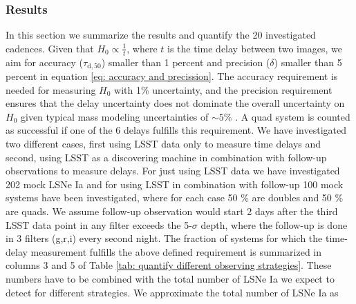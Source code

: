 \subsubsection{Results}
\label{sec:results}
In this section we summarize the results and quantify the 20
investigated cadences. Given that $H_0 \propto \frac{1}{t}$, where $t$
is the time delay between two images, we aim for accuracy
($\tau_\mathrm{d,50}$) smaller than 1 percent and precision ($\delta$)
smaller than 5 percent in equation \ref{eq: accuracy and precission}. The accuracy
requirement is needed for measuring $H_0$ with 1\% uncertainty, and
the precision requirement ensures that the delay uncertainty does not
dominate the overall uncertainty on $H_0$ given typical mass modeling
uncertainties of $\sim 5\%$ \citep[e.g.,][]{Suyu2018}.  A quad system is counted as successful if one of the 6 delays fulfills this requirement. 
We have investigated two different cases, first using LSST data only to measure time delays and second, using LSST as a discovering machine in combination with follow-up observations to measure delays. 
For just using LSST data we have investigated 202 mock LSNe Ia and for using LSST in combination with follow-up 100 mock systems have been investigated, where for each case 50 \% are doubles and 50 \% are quads. 
We assume follow-up observation would start 2 days 
after the third LSST data point in any filter exceeds the 5-$\sigma$ 
depth, where the follow-up is done in 3 filters (g,r,i) every second night.
The fraction of systems for which the time-delay measurement fulfills the above defined requirement is summarized in columns 3 and 5 of Table \ref{tab: quantify different observing strategies}. These numbers have to be combined with the total number of LSNe Ia we expect to detect for different strategies. We approximate the total number of LSNe Ia as

